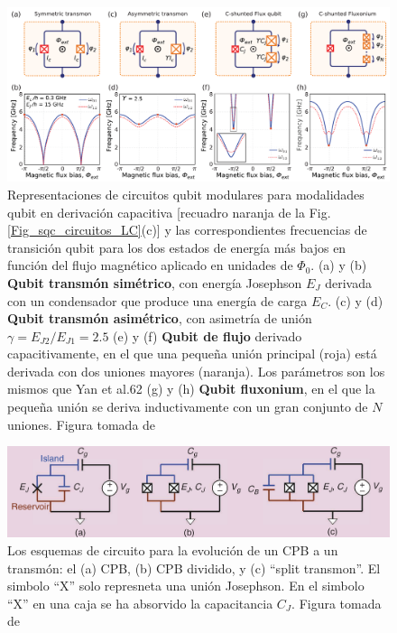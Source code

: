     

    \begin{figure}[h]
        \centering 
        \includegraphics[width=1\linewidth]{Figuras/Fig_scq_split_transmon_main.png}
        \caption{Representaciones de circuitos qubit modulares para modalidades qubit en derivación capacitiva [recuadro naranja de la Fig. \ref{Fig_sqc_circuitos_LC}(c)] y las correspondientes frecuencias de transición qubit para los dos estados de energía más bajos en función del flujo magnético aplicado en unidades de $\Phi_0$. (a) y (b) \textbf{Qubit transmón simétrico}, con energía Josephson $E_J$ derivada con un condensador que produce una energía de carga $E_C$. (c) y (d) \textbf{Qubit transmón asimétrico}, con asimetría de unión $\gamma = E_{J2}/E_{J1}=2.5$ (e) y (f) \textbf{Qubit de flujo} derivado capacitivamente, en el que una pequeña unión principal (roja) está derivada con dos uniones mayores (naranja). Los parámetros son los mismos que Yan et al.62 (g) y (h) \textbf{Qubit fluxonium}, en el que la pequeña unión se deriva inductivamente con un gran conjunto de $N$ uniones. Figura tomada de  \cite{bib_A_quantum_engineers_guide}}
        \label{Fig_scq_split_transmon_main}
    \end{figure}



    \begin{figure}[h]
    	\centering 
    	\includegraphics[width=1\linewidth]{Figuras/Fig_scq_split_transmon.png}
    	\caption{Los esquemas de circuito para la evolución de un CPB a un transmón: el (a) CPB, (b) CPB dividido, y (c) ``split transmon''. El simbolo ``X'' solo represneta una unión Josephson. En el simbolo ``X'' en una caja se ha absorvido la capacitancia $C_J$.  Figura tomada de \cite{Bib_scq_transmon_qubit_for_electromagnetic_engineers}}
    	\label{Fig_scq_split_transmon}
	\end{figure}

